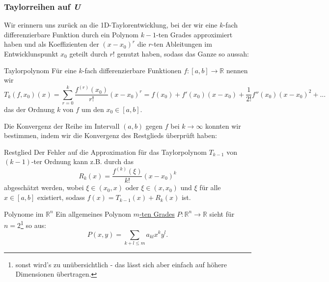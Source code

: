 \subsubsection{Taylorreihen auf \textit{U}}
Wir erinnern uns zurück an die 1D-Taylorentwicklung, bei der wir eine $k$-fach differenzierbare Funktion durch ein Polynom $k-1$-ten Grades approximiert haben und als Koeffizienten der $(x-x_0)^r$ die $r$-ten Ableitungen im Entwicklunspunkt $x_0$ geteilt durch $r!$ genutzt haben, sodass das Ganze so aussah:
\begin{Wiederholung}
{Taylorpolynom}
Für eine $k$-fach differenzierbare Funktionen $f:[a,b]\to\mathbb{R}$ nennen wir
\begin{equation*}
    T_k(f,x_0)(x)=\sum_{r=0}^k\frac{f^{(r)}(x_0)}{r!}(x-x_0)^r=f(x_0)+f'(x_0)(x-x_0)+\frac{1}{2!}f''(x_0)(x-x_0)^2+...
\end{equation*}
das  der Ordnung $k$ von $f$ um den  $x_0\in[a,b]$.
\end{Wiederholung}
Die Konvergenz der Reihe im Intervall $(a,b)$ gegen $f$ bei $k\to\infty$ konnten wir bestimmen, indem wir die Konvergenz des Restglieds überprüft haben:
\begin{Wiederholung}
{Restglied}
Der Fehler auf die Approximation für das Taylorpolynom $T_{k-1}$ von $(k-1)$-ter Ordnung kann z.B. durch das 
\begin{equation*}
    R_k(x)=\frac{f^{(k)}(\xi)}{k!}(x-x_0)^k
\end{equation*}
abgeschätzt werden, wobei $\xi\in(x_0,x)$ oder $\xi\in(x,x_0)$ und $\xi$ für alle $x\in[a,b]$ existiert, sodass $f(x)=T_{k-1}(x)+R_k(x)$ ist.
\end{Wiederholung}
\begin{Def}
{Polynome im $\mathbb{R}^n$}
Ein allgemeines Polynom \underline{$m$-ten Grades} $P:\mathbb{R}^n\to\mathbb{R}$ sieht für $n=2$\footnote{sonst wird's zu unübersichtlich - das lässt sich aber einfach auf höhere Dimensionen übertragen.} so aus:
\begin{equation}
    P(x,y)=\sum_{k+l\leq m}a_{kl}x^ky^l.
\end{equation}
\end{Def}

